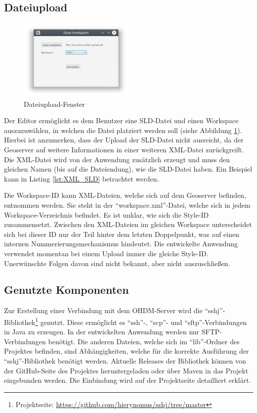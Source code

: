 \subsection{Dateiupload}

\begin{figure}[h]
 \centering
 \includegraphics[width=0.5\textwidth]{abb/dateiupload}
 \caption{Dateiupload-Fenster}\label{abb:dateiupload}
\end{figure}

Der Editor ermöglicht es dem Benutzer eine SLD-Datei und einen Workspace auszuzuwählen, in welchen die Datei platziert werden soll (siehe Abbildung \ref{abb:dateiupload}). Hierbei ist anzumerken, dass der Upload der SLD-Datei nicht ausreicht, da der Geoserver auf weitere Informationen in einer weiteren XML-Datei zurückgreift. Die XML-Datei wird von der Anwendung zusätzlich erzeugt und muss den gleichen Namen (bis auf die Dateiendung), wie die SLD-Datei haben. Ein Beispiel kann in Listing \ref{lst:XML_SLD} betrachtet werden. 

Die Workspace-ID kann XML-Dateien, welche sich auf dem Geoserver befinden, entnommen werden. Sie steht in der \enquote{workspace.xml}-Datei, welche sich in jedem Workspace-Verzeichnis befindet. Es ist unklar, wie sich die Style-ID zusammensetzt. Zwischen den XML-Dateien im gleichen Workspace unterscheidet sich bei dieser ID nur der Teil hinter dem letzten Doppelpunkt, was auf einen internen Nummerierungsmechanismus hindeutet. Die entwickelte Anwendung verwendet momentan bei einem Upload immer die gleiche Style-ID. Unerwünschte Folgen davon sind nicht bekannt, aber nicht auszuschließen.  

\subsection{Genutzte Komponenten}
Zur Erstellung einer Verbindung mit dem OHDM-Server wird die \enquote{sshj}-Bibliothek\footnote{Projektseite: \url{https://github.com/hierynomus/sshj/tree/master}} genutzt. Diese ermöglicht es \enquote{ssh}-, \enquote{scp}- und \enquote{sftp}-Verbindungen in Java zu erzeugen. In der entwickelten Anwendung werden nur SFTP-Verbindungen benötigt. Die anderen Dateien, welche sich im \enquote{lib}-Ordner des Projektes befinden, sind Abhängigkeiten, welche für die korrekte Ausführung der \enquote{sshj}-Bibliothek benötigt werden. 
Aktuelle Releases der Bibliothek können von der GitHub-Seite des Projektes heruntergeladen oder über Maven in das Projekt eingebunden werden. Die Einbindung wird auf der Projektseite detailliert erklärt.